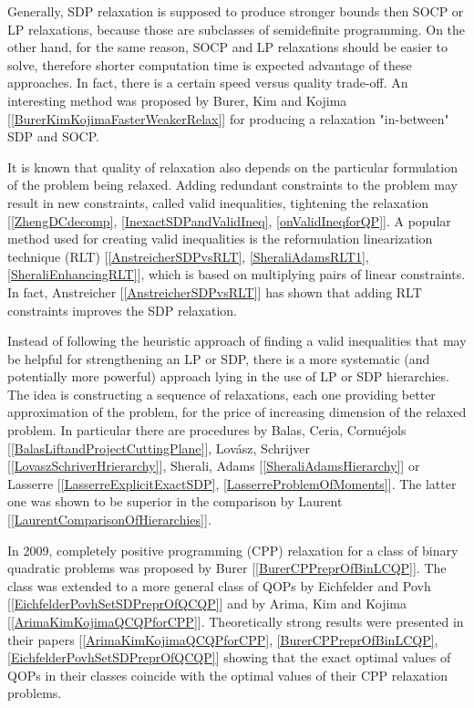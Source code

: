 \documentclass[12pt]{book}
\theoremstyle{definition}
\begin{document}
Generally, SDP relaxation is supposed to produce stronger bounds then SOCP or LP relaxations, because those are subclasses of semidefinite programming. On the other hand, for the same reason, SOCP and LP relaxations should be easier to solve, therefore shorter computation time is expected advantage of these approaches. In fact, there is a certain speed versus quality trade-off. 
An interesting method was proposed by Burer, Kim and Kojima [\ref{BurerKimKojimaFasterWeakerRelax}] for producing a relaxation "in-between" SDP and SOCP. 


It is known that quality of relaxation also depends on the particular formulation of the problem being relaxed. Adding redundant constraints to the problem may result in new constraints, called valid inequalities, tightening the relaxation [\ref{ZhengDCdecomp}, \ref{InexactSDPandValidIneq}, \ref{onValidIneqforQP}]. A popular method used for creating valid inequalities is the reformulation linearization technique (RLT) [\ref{AnstreicherSDPvsRLT}, \ref{SheraliAdamsRLT1}, \ref{SheraliEnhancingRLT}], which is based on multiplying pairs of linear constraints. In fact, Anstreicher [\ref{AnstreicherSDPvsRLT}] has shown that adding RLT constraints improves the SDP relaxation.

Instead of following the heuristic approach of finding a valid inequalities that may be helpful
for strengthening an LP or SDP, there is a more systematic (and potentially more powerful) approach
lying in the use of LP or SDP hierarchies. The idea is constructing a sequence of relaxations, each one providing better approximation of the problem, for the price of increasing dimension of the relaxed problem.
In particular there are procedures
by Balas, Ceria, Cornuéjols [\ref{BalasLiftandProjectCuttingPlane}], Lovász, Schrijver [\ref{LovaszSchriverHrierarchy}],  Sherali, Adams [\ref{SheraliAdamsHierarchy}] or Lasserre [\ref{LasserreExplicitExactSDP}, \ref{LasserreProblemOfMoments}]. The latter one was shown to be superior in the comparison by Laurent [\ref{LaurentComparisonOfHierarchies}].



In 	2009, completely positive programming (CPP) relaxation for a class of binary quadratic problems was proposed
by Burer [\ref{BurerCPPreprOfBinLCQP}]. 
The class was extended to a more general class of QOPs by Eichfelder and
Povh [\ref{EichfelderPovhSetSDPreprOfQCQP}] and by Arima, Kim and Kojima [\ref{ArimaKimKojimaQCQPforCPP}]. Theoretically strong results were presented in
their papers [\ref{ArimaKimKojimaQCQPforCPP}, \ref{BurerCPPreprOfBinLCQP}, \ref{EichfelderPovhSetSDPreprOfQCQP}] showing that the exact optimal values of QOPs in their classes coincide
with the optimal values of their CPP relaxation problems.
\end{document}
